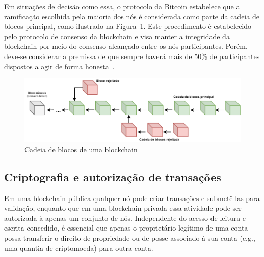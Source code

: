 
Em situações de decisão como essa, o protocolo da Bitcoin estabelece que a ramificação escolhida pela maioria dos nós é considerada como parte da cadeia de blocos principal, como ilustrado na Figura~\ref{fig:cadeia_blocos}. Este procedimento é estabelecido pelo protocolo de consenso da blockchain e visa manter a integridade da blockchain por meio do consenso alcançado entre os nós participantes. Porém, deve-se considerar a premissa de que sempre haverá mais de 50\% de participantes dispostos a agir de forma honesta~\cite{overview-bitcoin2008nakamoto}. 

\begin{figure}[htb]
 \caption{Cadeia de blocos de uma blockchain}
 \label{fig:cadeia_blocos}
 \centering
 \includegraphics[scale=0.4]{figuras/cadeia_de_blocos.png}
\end{figure}
 
\subsection{Criptografia e autorização de transações} \label{tex:fund:blockchain:cripto}

Em uma blockchain pública qualquer nó pode criar transações e submetê-las para validação, enquanto que em uma blockchain privada essa atividade pode ser autorizada à apenas um conjunto de nós. Independente do acesso de leitura e escrita concedido, é essencial que apenas o proprietário legítimo de uma conta possa transferir o direito de propriedade ou de posse associado à sua conta (e.g., uma quantia de criptomoeda) para outra conta. 

